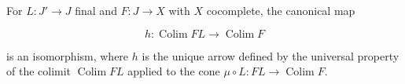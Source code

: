 For $L: J' \rightarrow J$ final and $F: J \rightarrow X$ with $X$ cocomplete, the canonical map

$$h: \operatorname{Colim} F L \rightarrow \operatorname{Colim} F$$

is an isomorphism, where $h$ is the unique arrow defined by the universal property of the colimit $\operatorname{Colim} F L$ applied to the cone $\mu \circ L : F L \rightarrow \operatorname{Colim} F$.
